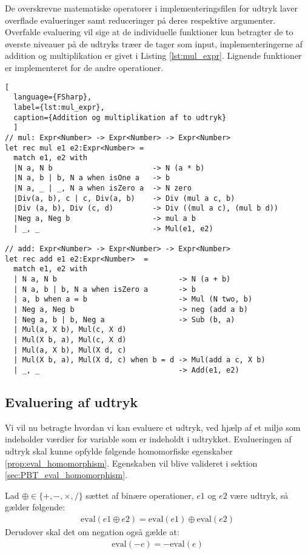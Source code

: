 De overskrevne matematiske operatorer i implementeringsfilen for udtryk laver overflade evalueringer samt reduceringer på deres respektive argumenter. Overfalde evaluering vil sige at de individuelle funktioner kun betragter de to øverste niveauer på de udtryks træer de tager som input, implementeringerne af addition og multiplikation er givet i Listing \ref{lst:mul_expr}. Lignende funktioner er implementeret for de andre operationer.

\begin{lstlisting}[
  language={FSharp}, 
  label={lst:mul_expr}, 
  caption={Addition og multiplikation af to udtryk}
  ]
// mul: Expr<Number> -> Expr<Number> -> Expr<Number>
let rec mul e1 e2:Expr<Number> =
  match e1, e2 with
  |N a, N b                       -> N (a * b)
  |N a, b | b, N a when isOne a   -> b
  |N a, _ | _, N a when isZero a  -> N zero
  |Div(a, b), c | c, Div(a, b)    -> Div (mul a c, b)
  |Div (a, b), Div (c, d)         -> Div ((mul a c), (mul b d))
  |Neg a, Neg b                   -> mul a b
  | _, _                          -> Mul(e1, e2)

// add: Expr<Number> -> Expr<Number> -> Expr<Number>
let rec add e1 e2:Expr<Number>  =
  match e1, e2 with
  | N a, N b                            -> N (a + b)
  | N a, b | b, N a when isZero a       -> b
  | a, b when a = b                     -> Mul (N two, b)
  | Neg a, Neg b                        -> neg (add a b) 
  | Neg a, b | b, Neg a                 -> Sub (b, a)
  | Mul(a, X b), Mul(c, X d) 
  | Mul(X b, a), Mul(c, X d)
  | Mul(a, X b), Mul(X d, c) 
  | Mul(X b, a), Mul(X d, c) when b = d -> Mul(add a c, X b)
  | _, _                                -> Add(e1, e2)

\end{lstlisting}

\subsection{Evaluering af udtryk}\label{sec:eval}
Vi vil nu betragte hvordan vi kan evaluere et udtryk, ved hjælp af et miljø som indeholder værdier for variable som er indeholdt i udtrykket. Evalueringen af udtryk skal kunne opfylde følgende homomorfiske egenskaber \ref{prop:eval_homomorphism}. Egenskaben vil blive valideret i sektion \ref{sec:PBT_eval_homomorphism}.
\vspace{0.5cm}
\begin{egenskab}\label{prop:eval_homomorphism}
Lad $\oplus \in \{+, -, \times, /\}$ sættet af binære operationer, $e1$ og $e2$ være udtryk, så gælder følgende:
\begin{align*}
    \text{eval}(e1 \oplus e2) = \text{eval}(e1) \oplus \text{eval}(e2)
\end{align*}
Derudover skal det om negation også gælde at:
\begin{align*}
    \text{eval}(-e) = -\text{eval}(e)
\end{align*}
\end{egenskab}


